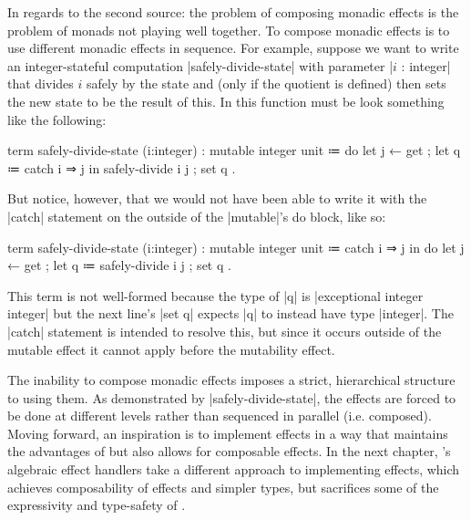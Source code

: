 In regards to the second source:
the problem of composing monadic effects is the problem of
monads not playing well together.
To compose monadic effects is to use different monadic effects in sequence.
For example, suppose we want to write an integer-stateful computation \code|safely-divide-state| with parameter \code|$i$ : integer| that divides $i$ safely by the state and (only if the quotient is defined) then sets the new state to be the result of this.
In \LangC this function must be look something like the following:
\begin{snippet}
term safely-divide-state (i:integer) : mutable integer unit
  ≔ do
      { let j ← get
      ; let q ≔ catch{ i ⇒ j } in safely-divide i j
      ; set q }.
\end{snippet}
But notice, however, that we would not have been able to write it with the \code|catch| statement on the outside of the \code|mutable|'s do block, like so:
\begin{snippet}
term safely-divide-state (i:integer) : mutable integer unit
  ≔ catch{ i ⇒ j } in
    do
      { let j ← get
      ; let q ≔ safely-divide i j
      ; set q }.
\end{snippet}
This term is not well-formed because the type of \code|q| is \code|exceptional integer integer| but the next line's \code|set q| expects \code|q| to instead have type \code|integer|.
The \code|catch| statement is intended to resolve this, but since it occurs outside of the mutable effect it cannot apply before the mutability effect.

%
The inability to compose monadic effects imposes a strict, hierarchical structure to using them.
As demonstrated by \code|safely-divide-state|, the effects are forced to be done at different levels rather than sequenced in parallel (i.e. composed).
Moving forward, an inspiration is to implement effects in a way that maintains the advantages of \LangC but also allows for composable effects.
In the next chapter, \LangD's algebraic effect handlers take a different approach to implementing effects, which achieves composability of effects and simpler types, but sacrifices some of the expressivity and type-safety of \LangC.
